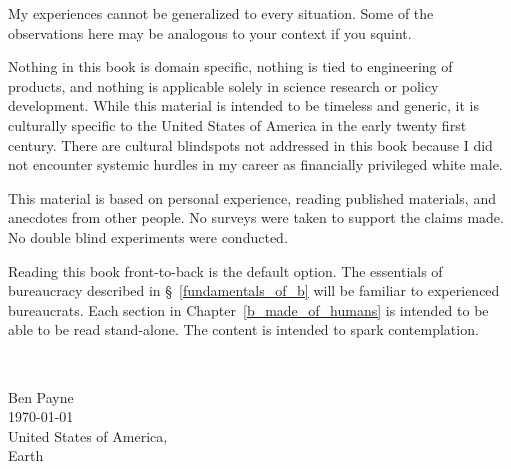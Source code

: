 My experiences cannot be generalized to every situation. Some of the observations here may be analogous to your context if you squint. 

Nothing in this book is domain specific, nothing is tied to engineering of products, and nothing is applicable solely in science research or policy development. While this material is intended to be timeless and generic, it is culturally specific to the United States of America in the early twenty first century. There are cultural blindspots not addressed in this book because I did not encounter systemic hurdles in my career as financially privileged white male. 

This material is based on personal experience, reading published materials, and anecdotes from other people. No surveys were taken to support the claims made. No double blind experiments were conducted. 

Reading this book front-to-back is the default option. 
The essentials of bureaucracy described in \S~\ref{fundamentals_of_b} will be familiar to experienced bureaucrats. Each section in Chapter~\ref{b_made_of_humans} is intended to be able to be read stand-alone. The content is intended to spark contemplation. 

\ \\

\begin{flushright}
Ben Payne\\
\today\\
United States of America,\\
Earth
\end{flushright}


